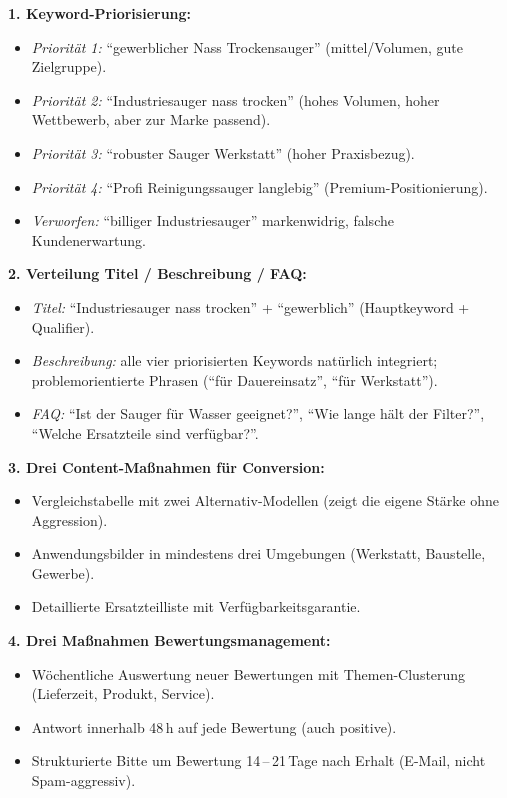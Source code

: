 \documentclass[11pt,a4paper,oneside]{article}
\begin{document}
\begin{loesungbox}
\textbf{1. Keyword-Priorisierung:}
\begin{itemize}
  \item \emph{Priorität 1:} ``gewerblicher Nass Trockensauger'' (mittel/Volumen, gute Zielgruppe).
  \item \emph{Priorität 2:} ``Industriesauger nass trocken'' (hohes Volumen, hoher Wettbewerb, aber zur Marke passend).
  \item \emph{Priorität 3:} ``robuster Sauger Werkstatt'' (hoher Praxisbezug).
  \item \emph{Priorität 4:} ``Profi Reinigungssauger langlebig'' (Premium-Positionierung).
  \item \emph{Verworfen:} ``billiger Industriesauger'' \textendash{} markenwidrig, falsche Kundenerwartung.
\end{itemize}

\textbf{2. Verteilung Titel / Beschreibung / FAQ:}
\begin{itemize}
  \item \emph{Titel:} ``Industriesauger nass trocken'' + ``gewerblich'' (Hauptkeyword + Qualifier).
  \item \emph{Beschreibung:} alle vier priorisierten Keywords natürlich integriert; problemorientierte Phrasen (``für Dauereinsatz'', ``für Werkstatt'').
  \item \emph{FAQ:} ``Ist der Sauger für Wasser geeignet?'', ``Wie lange hält der Filter?'', ``Welche Ersatzteile sind verfügbar?''.
\end{itemize}

\textbf{3. Drei Content-Maßnahmen für Conversion:}
\begin{itemize}
  \item Vergleichstabelle mit zwei Alternativ-Modellen (zeigt die eigene Stärke ohne Aggression).
  \item Anwendungsbilder in mindestens drei Umgebungen (Werkstatt, Baustelle, Gewerbe).
  \item Detaillierte Ersatzteilliste mit Verfügbarkeitsgarantie.
\end{itemize}

\textbf{4. Drei Maßnahmen Bewertungsmanagement:}
\begin{itemize}
  \item Wöchentliche Auswertung neuer Bewertungen mit Themen-Clusterung (Lieferzeit, Produkt, Service).
  \item Antwort innerhalb 48\,h auf jede Bewertung (auch positive).
  \item Strukturierte Bitte um Bewertung 14\,--\,21\,Tage nach Erhalt (E-Mail, nicht Spam-aggressiv).
\end{itemize}


\end{loesungbox}
\end{document}
